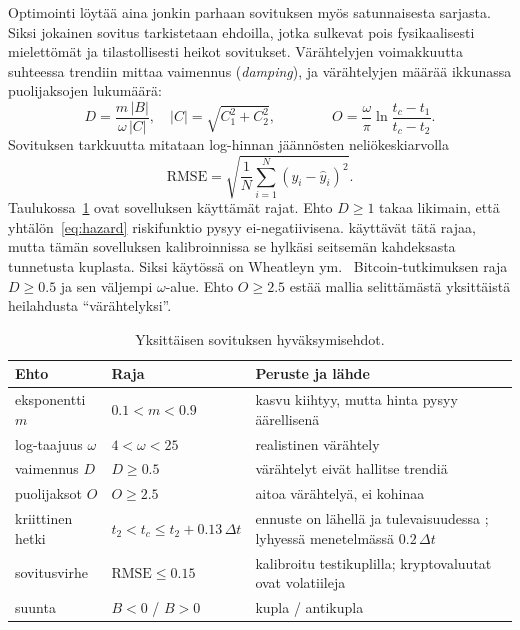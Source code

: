 \documentclass[10pt,a4paper]{article}
\newcommand{\tc}{t_c}
\begin{document}
Optimointi löytää aina jonkin parhaan sovituksen myös satunnaisesta sarjasta. Siksi jokainen
sovitus tarkistetaan ehdoilla, jotka sulkevat pois fysikaalisesti mielettömät ja
tilastollisesti heikot sovitukset. Värähtelyjen voimakkuutta suhteessa trendiin mittaa
vaimennus (\emph{damping}), ja värähtelyjen määrää ikkunassa puolijaksojen lukumäärä:
\begin{equation}\label{eq:damping}
  D = \frac{m\,|B|}{\omega\,|C|},\quad |C|=\sqrt{C_1^2+C_2^2},\qquad\qquad
  O = \frac{\omega}{\pi}\ln\frac{\tc-t_1}{\tc-t_2}.
\end{equation}
Sovituksen tarkkuutta mitataan log-hinnan jäännösten neliökeskiarvolla
\begin{equation}\label{eq:rmse}
  \mathrm{RMSE} = \sqrt{\frac{1}{N}\sum_{i=1}^{N}\left(y_i-\hat y_i\right)^2}.
\end{equation}
Taulukossa~\ref{tab:suodatin} ovat sovelluksen käyttämät rajat. Ehto $D \ge 1$ takaa likimain,
että yhtälön~\eqref{eq:hazard} riskifunktio pysyy ei-negatiivisena. \citet{zhang2016} käyttävät
tätä rajaa, mutta tämän sovelluksen kalibroinnissa se hylkäsi seitsemän kahdeksasta tunnetusta
kuplasta. Siksi käytössä on Wheatleyn ym.\ \citeyearpar{wheatley2019}
Bitcoin-tutkimuksen raja $D \ge 0.5$ ja sen väljempi $\omega$-alue. Ehto $O \ge 2.5$ estää mallia
selittämästä yksittäistä heilahdusta \enquote{värähtelyksi}.

\begin{table}[htbp]
  \centering\small
  \begin{tabularx}{\textwidth}{@{}l l X@{}}
    \toprule
    Ehto & Raja & Peruste ja lähde \\
    \midrule
    eksponentti $m$ & $0.1 < m < 0.9$ & kasvu kiihtyy, mutta hinta pysyy äärellisenä \citep{zhang2016} \\
    log-taajuus $\omega$ & $4 < \omega < 25$ & realistinen värähtely \citep{wheatley2019} \\
    vaimennus $D$ & $D \ge 0.5$ & värähtelyt eivät hallitse trendiä \citep{wheatley2019} \\
    puolijaksot $O$ & $O \ge 2.5$ & aitoa värähtelyä, ei kohinaa \citep{zhang2016} \\
    kriittinen hetki & $t_2 < \tc \le t_2 + 0.13\,\Delta t$ & ennuste on lähellä ja tulevaisuudessa \citep{zhang2016}; lyhyessä menetelmässä $0.2\,\Delta t$ \\
    sovitusvirhe & $\mathrm{RMSE} \le 0.15$ & kalibroitu testikuplilla; kryptovaluutat ovat volatiileja \\
    suunta & $B<0$ / $B>0$ & kupla / antikupla \\
    \bottomrule
  \end{tabularx}
  \caption{Yksittäisen sovituksen hyväksymisehdot.}
  \label{tab:suodatin}
\end{table}
\end{document}
